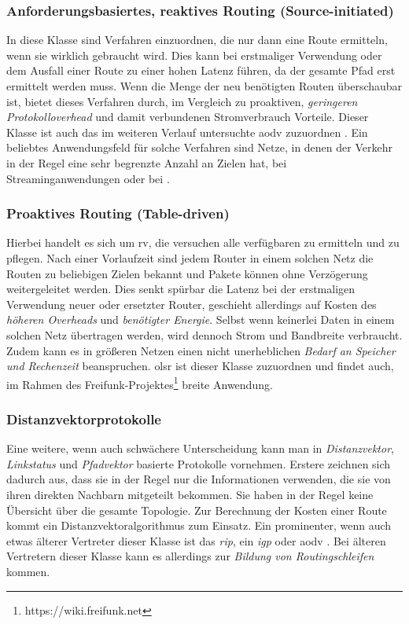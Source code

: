 \subsubsection{Anforderungsbasiertes, reaktives Routing (Source-initiated)}

In diese Klasse sind Verfahren einzuordnen, die nur dann eine Route ermitteln, wenn sie wirklich gebraucht wird. Dies kann bei erstmaliger Verwendung oder dem Ausfall einer Route zu einer hohen Latenz führen, da der gesamte Pfad erst ermittelt werden muss. Wenn die Menge der neu benötigten Routen überschaubar ist, bietet dieses Verfahren durch, im Vergleich zu proaktiven, \textit{geringeren Protokolloverhead} und damit verbundenen Stromverbrauch Vorteile. Dieser Klasse ist auch das im weiteren Verlauf untersuchte \gls{aodv} zuzuordnen \cite{RFC3561}. Ein beliebtes Anwendungsfeld für solche Verfahren sind  Netze, in denen der Verkehr in der Regel eine sehr begrenzte Anzahl an Zielen hat, \zB bei Streaminganwendungen oder bei  \cite{Booranawong13}.

\subsubsection{Proaktives Routing (Table-driven)}

Hierbei handelt es sich um \acrlong{rv}, die versuchen alle verfügbaren zu ermitteln und zu pflegen. Nach einer Vorlaufzeit sind jedem Router in einem solchen Netz die Routen zu beliebigen Zielen bekannt und Pakete können ohne Verzögerung weitergeleitet werden. Dies senkt spürbar die Latenz bei der erstmaligen Verwendung neuer oder ersetzter Router, geschieht allerdings auf Kosten des \textit{höheren Overheads} und \textit{benötigter Energie}. Selbst wenn keinerlei Daten in einem solchen Netz übertragen werden, wird dennoch Strom und Bandbreite verbraucht. Zudem kann es in größeren Netzen einen nicht unerheblichen \textit{Bedarf an Speicher und Rechenzeit} beanspruchen. \gls{olsr} ist dieser Klasse zuzuordnen \cite{RFC3626} und findet auch, \zB im Rahmen des Freifunk-Projektes\footnote{https://wiki.freifunk.net} breite Anwendung.

\subsubsection{Distanzvektorprotokolle}

Eine weitere, wenn auch schwächere Unterscheidung kann man in \textit{Distanzvektor}, \textit{Linkstatus} und \textit{Pfadvektor} basierte Protokolle vornehmen. Erstere zeichnen sich dadurch aus, dass sie in der Regel nur die Informationen verwenden, die sie von ihren direkten Nachbarn mitgeteilt bekommen. Sie haben in der Regel keine Übersicht über die gesamte Topologie. Zur Berechnung der Kosten einer Route kommt ein Distanzvektoralgorithmus zum Einsatz. Ein prominenter, wenn auch etwas älterer Vertreter dieser Klasse ist das \textit{\gls{rip}}, ein \textit{\gls{igp}} \cite{RFC1058} oder \acrlong{aodv} \cite{RFC3561}. Bei älteren Vertretern dieser Klasse kann es allerdings zur \textit{Bildung von Routingschleifen} kommen.

